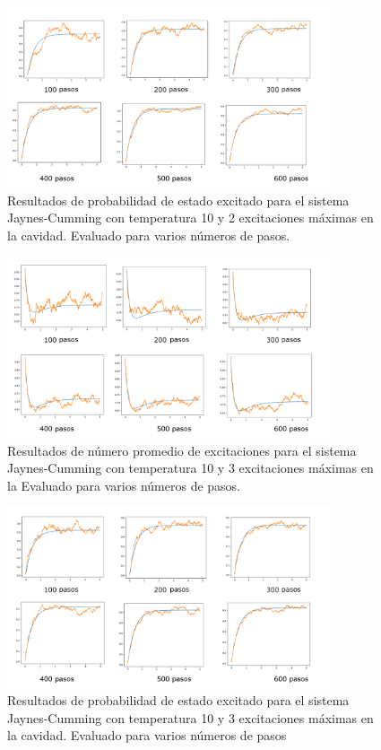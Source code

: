 \documentclass{book}
\begin{document}
\begin{figure}[ht]
    \includegraphics[width=0.85\textwidth]{test1_T10_pobe.png}
    \caption{Resultados de probabilidad de estado excitado para el sistema Jaynes-Cumming con temperatura 10 y  2 excitaciones máximas en la cavidad. Evaluado para varios números de pasos.}
\end{figure}

\begin{figure}[ht]
    \includegraphics[width=0.85\textwidth]{test2_T10_pob0.png}
    \caption{Resultados de número promedio de excitaciones para el sistema Jaynes-Cumming con temperatura 10 y 3 excitaciones máximas en la  Evaluado para varios números de pasos.}
\end{figure}

\begin{figure}[ht]
    \includegraphics[width=0.85\textwidth]{test2_T10_pobe.png}
    \caption{Resultados de probabilidad de estado excitado para el sistema Jaynes-Cumming con temperatura 10 y 3 excitaciones máximas en la cavidad. Evaluado para varios números de pasos }
\end{figure}
\end{document}
